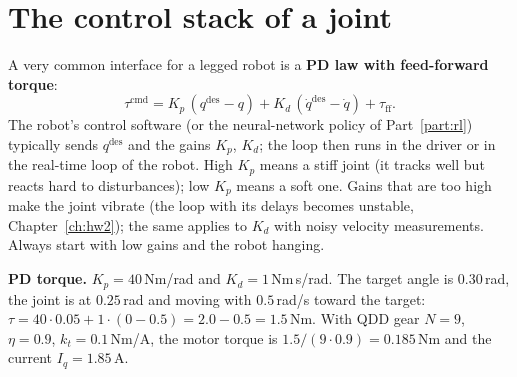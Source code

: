 \section*{The control stack of a joint}
\begin{center}
\label{fig:hw7_stack}
\end{center}
A very common interface for a legged robot is a \textbf{PD law with feed-forward torque}:
\[
\tau^\text{cmd}=K_p\,(q^\text{des}-q)+K_d\,(\dot q^\text{des}-\dot q)+\tau_\text{ff}.
\]
The robot's control software (or the neural-network policy of Part~\ref{part:rl}) typically sends $q^\text{des}$ and the gains $K_p$, $K_d$; the loop then runs in the driver or in the real-time loop of the robot. High $K_p$ means a stiff joint (it tracks well but reacts hard to disturbances); low $K_p$ means a soft one. Gains that are too high make the joint vibrate (the loop with its delays becomes unstable, Chapter~\ref{ch:hw2}); the same applies to $K_d$ with noisy velocity measurements. Always start with low gains and the robot hanging.
\begin{example}
\textbf{PD torque.} $K_p=40$\,Nm/rad and $K_d=1$\,Nm\,s/rad. The target angle is $0.30$\,rad, the joint is at $0.25$\,rad and moving with $0.5$\,rad/s toward the target: $\tau=40\cdot0.05+1\cdot(0-0.5)=2.0-0.5=1.5$\,Nm. With QDD gear $N=9$, $\eta=0.9$, $k_t=0.1$\,Nm/A, the motor torque is $1.5/(9\cdot0.9)=0.185$\,Nm and the current $I_q=1.85$\,A.
\end{example}

